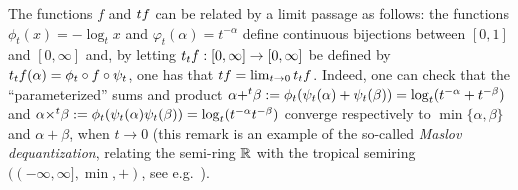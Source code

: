 The functions $f$ and $\trop f$ can be related by a limit passage as follows: the functions $\phi_{t}(x)= -\log_{t}x$ and $\varphi_{t}(\alpha)= t^{-\alpha}$ define continuous bijections between $[0,1]$ and $[0,\infty]$ and, by letting
$\trop_{t}f: [0,\infty]\to [0,\infty]$ be defined by 
$\trop_{t}f(\alpha)= \phi_{t}\circ f \circ \psi_{t}$, one has that 
$\trop f= \lim_{t\to 0}\trop_{t}f$. 
Indeed, one can check that the ``parameterized'' sums and product $\alpha {+}^{t}\beta:= \phi_{t}(\psi_{t}(\alpha)+\psi_{t}(\beta))= \log_{t}(t^{-\alpha}+t^{-\beta})$ and 
$\alpha {\times}^{t}\beta:= \phi_{t}( \psi_{t}(\alpha)\psi_{t}(\beta))=
\log_{t}(t^{-\alpha}t^{-\beta})$ converge respectively to $\min\{\alpha,\beta\}$ and $\alpha+\beta$, when $t\to 0$ (this remark is an example of the so-called \emph{Maslov dequantization}, relating the semi-ring $\mathbb{R}$ with the tropical semiring $((-\infty, \infty], \min, +)$, see e.g.~\cite{Litvinov2007}).



%
%
% 

